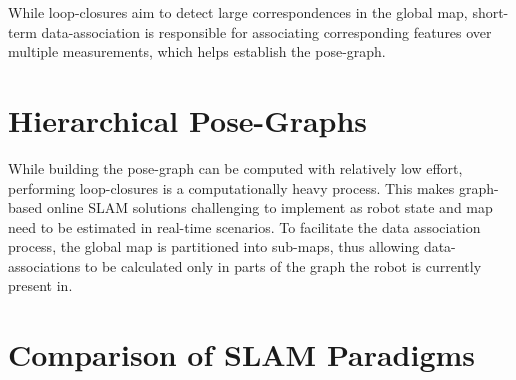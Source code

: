 While loop-closures aim to detect large correspondences in the global map, short-term data-association is responsible for associating corresponding features over multiple measurements, which helps establish the pose-graph.  

\section{Hierarchical Pose-Graphs}
While building the pose-graph can be computed with relatively low effort, performing loop-closures is a computationally heavy process. This makes graph-based online SLAM solutions challenging to implement as robot state and map need to be estimated in real-time scenarios. To facilitate the data association process, the global map is partitioned into sub-maps, thus allowing data-associations to be calculated only in parts of the graph the robot is currently present in.  

\section{Comparison of SLAM Paradigms}





